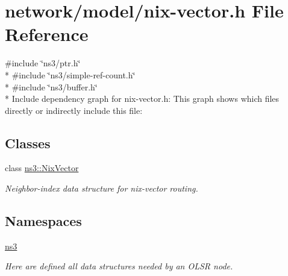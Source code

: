 \hypertarget{nix-vector_8h}{}\section{network/model/nix-\/vector.h File Reference}
\label{nix-vector_8h}
{\ttfamily \#include \char`\"{}ns3/ptr.\+h\char`\"{}}\\*
{\ttfamily \#include \char`\"{}ns3/simple-\/ref-\/count.\+h\char`\"{}}\\*
{\ttfamily \#include \char`\"{}ns3/buffer.\+h\char`\"{}}\\*
Include dependency graph for nix-\/vector.h\+:
This graph shows which files directly or indirectly include this file\+:
\subsection*{Classes}
\begin{DoxyCompactItemize}
\item 
class \hyperlink{classns3_1_1NixVector}{ns3\+::\+Nix\+Vector}
\begin{DoxyCompactList}\small\item\em Neighbor-\/index data structure for nix-\/vector routing. \end{DoxyCompactList}\end{DoxyCompactItemize}
\subsection*{Namespaces}
\begin{DoxyCompactItemize}
\item 
 \hyperlink{namespacens3}{ns3}
\begin{DoxyCompactList}\small\item\em Here are defined all data structures needed by an O\+L\+SR node. \end{DoxyCompactList}\end{DoxyCompactItemize}
